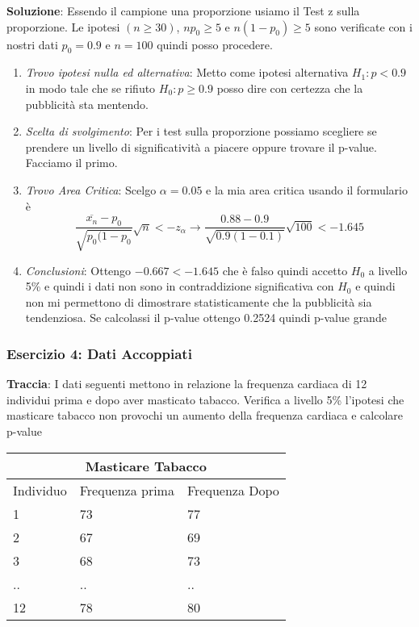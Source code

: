 \ind \textbf{Soluzione}: Essendo il campione una proporzione usiamo il Test z sulla proporzione. Le ipotesi $(n \geq 30)$, $np_0 \geq 5$ e $n(1 - p_0) \geq 5$ sono verificate con i nostri dati $p_0 = 0.9$ e $n=100$ quindi posso procedere.
\begin{enumerate}
    \item \textit{Trovo ipotesi nulla ed alternativa}: Metto come ipotesi alternativa $H_1 : p < 0.9$ in modo tale che se rifiuto $H_0: p \geq 0.9$ posso dire con certezza che la pubblicità sta mentendo.
    \item \textit{Scelta di svolgimento}: Per i test sulla proporzione possiamo scegliere se prendere un livello di significatività a piacere oppure trovare il p-value. Facciamo il primo.
    \item \textit{Trovo Area Critica}: Scelgo $\alpha=0.05$ e la mia area critica usando il formulario è $$\dfrac{\overline{x_n} - p_0}{\sqrt{p_0(1 - p_0}}\sqrt{n} < - z_{\alpha} \xrightarrow{} \dfrac{0.88 - 0.9}{\sqrt{0.9 (1 - 0.1)}}\sqrt{100} < - 1.645 $$
    \item \textit{Conclusioni}: Ottengo $- 0.667 < -1.645$ che è falso quindi accetto $H_0$ a livello 5\% e quindi i dati non sono in contraddizione significativa con $H_0$ e quindi non mi permettono di dimostrare statisticamente che la pubblicità sia tendenziosa. Se calcolassi il p-value ottengo 0.2524 quindi p-value grande
\end{enumerate}

\subsubsection{Esercizio 4: Dati Accoppiati}

\textbf{Traccia}: I dati seguenti mettono in relazione la frequenza cardiaca di 12 individui prima e dopo aver masticato tabacco. Verifica a livello 5\% l'ipotesi che masticare tabacco non provochi un aumento della frequenza cardiaca e calcolare p-value \n
\begin{tabular}{ |p{3.5cm}|p{3.5cm}|p{3.5cm}|  }
    \hline
    \multicolumn{3}{|c|}{Masticare Tabacco} \\
    \hline
    Individuo & Frequenza prima & Frequenza Dopo \\
    \hline
    1 &  73 & 77\\
    2 &  67 & 69 \\
    3 &  68 & 73 \\
    .. & .. & .. \\
    12 & 78 & 80 \\
    \hline
\end{tabular}
\break

